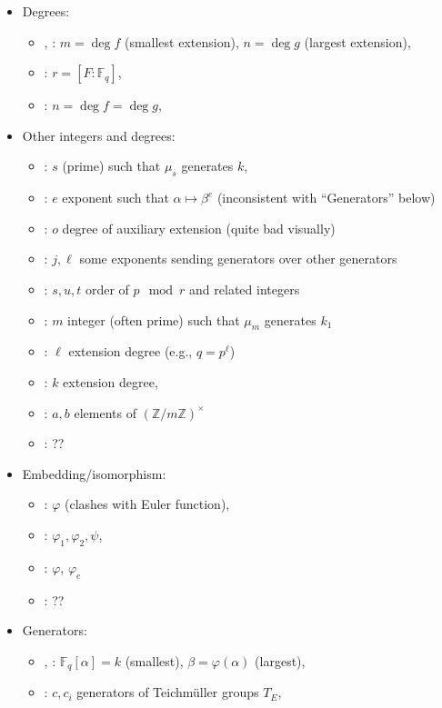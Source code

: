 \documentclass[12pt]{article}
\theoremstyle{plain}
\theoremstyle{definition}
\def\Z{\ensuremath{\mathbb{Z}}}
\def\F{\ensuremath{\mathbb{F}}}
\begin{document}
\begin{itemize}
\begin{itemize}
  \item \prop: ??
  \end{itemize}
\item Degrees:
  \begin{itemize}
  \item \poster, \prop: $m=\deg f$ (smallest extension), $n=\deg g$ (largest extension),
  \item \kummer: $r = [F:\F_q]$,
  \item \rains: $n=\deg f=\deg g$,
  \end{itemize}
\item Other integers and degrees:
  \begin{itemize}
  \item \poster: $s$ (prime) such that $\mu_s$ generates $k$,
  \item \poster: $e$ exponent such that $\alpha\mapsto\beta^e$
    (inconsistent with ``Generators'' below)
  \item \poster: $o$ degree of auxiliary extension (quite bad visually)
  \item \kummer: $j,\ell$ some exponents sending generators over other generators
  \item \kummer: $s,u,t$ order of $p \mod r$ and related integers
  \item \rains: $m$ integer (often prime) such that $\mu_m$ generates $k_1$ 
  \item \rains: $\ell$ extension degree (e.g., $q=p^\ell$)
  \item \rains: $k$ extension degree,
  \item \rains: $a,b$ elements of $(\Z/m\Z)^\times$
  \item \prop: ??
  \end{itemize}
\item Embedding/isomorphism:
  \begin{itemize}
  \item \poster: $\varphi$ (clashes with Euler function),
  \item \kummer: $\varphi_1,\varphi_2,\psi$,
  \item \rains: $\varphi$, $\varphi_e$
  \item \prop: ??
  \end{itemize}
\item Generators:
  \begin{itemize}
  \item \poster, \prop: $\F_q[\alpha]=k$ (smallest), $\beta = \varphi(\alpha)$ (largest), 
  \item \kummer: $c,c_i$ generators of Teichm\"uller groups $T_E$,

\end{itemize}
\end{itemize}
\end{document}
